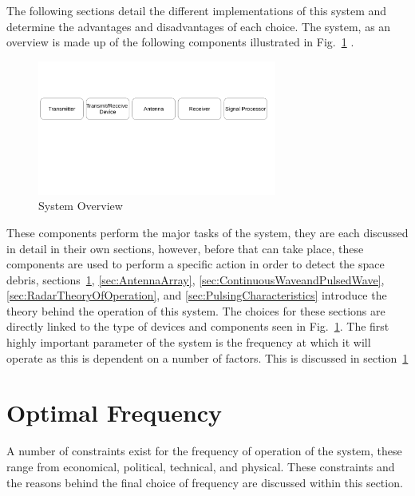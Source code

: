 \documentclass[11pt]{witseiepaper}
\begin{document}
\begin{bibunit}[witseie]
The following sections detail the different implementations of this system and determine the advantages and disadvantages of each choice.
The system, as an overview is made up of the following components illustrated in Fig.~\ref{fig:SystemOverview} \cite{radarHandbook}.

\begin{center}
    \begin{figure}
        \centering
        \includegraphics[width=0.7\textwidth]{SystemOverview.pdf}
        \caption{System Overview}
        \label{fig:SystemOverview}    
    \end{figure}
\end{center}

These components perform the major tasks of the system, they are each discussed in detail in their own sections, however, before that can take place, these components are used to perform a specific action in order to detect the space debris, sections~\ref{sec:OptimalFrequency}, \ref{sec:AntennaArray}, \ref{sec:ContinuousWaveandPulsedWave}, \ref{sec:RadarTheoryOfOperation}, and \ref{sec:PulsingCharacteristics} introduce the theory behind the operation of this system. The choices for these sections are directly linked to the type of devices and components seen in Fig.~\ref{fig:SystemOverview}.
The first highly important parameter of the system is the frequency at which it will operate as this is dependent on a number of factors. This is discussed in section~\ref{sec:OptimalFrequency}


\section{Optimal Frequency} \label{sec:OptimalFrequency}
A number of constraints exist for the frequency of operation of the system, these range from economical, political, technical, and physical. These constraints and the reasons behind the final choice of frequency are discussed within this section.


\end{bibunit}
\end{document}
